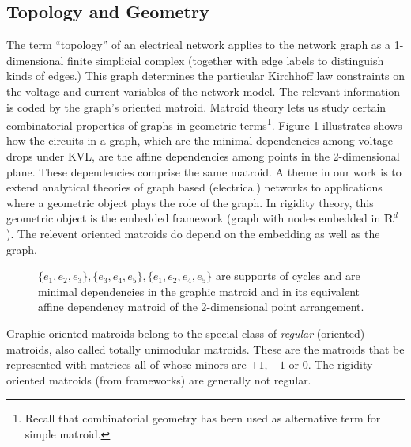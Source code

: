 \documentclass{amsproc-sunycstr}
\def\Reals{\ensuremath{\mathbf R}}
\theoremstyle{plain}
\theoremstyle{definition}
\theoremstyle{remark}
\begin{document}
\subsection{Topology and Geometry}
The term ``topology'' 
of an electrical network
applies to the network graph as a 
1-dimensional finite simplicial complex (together with edge labels to
distinguish kinds of edges.)  
This graph determines the particular Kirchhoff 
law constraints on the voltage and current variables
of the network model.
The relevant information is coded by the graph's
oriented matroid.
Matroid theory lets us study
certain combinatorial properties of graphs in geometric 
terms\footnote{Recall that combinatorial geometry has been
used as alternative term for simple matroid.}.  Figure \ref{graphgeo}
illustrates shows how the circuits in a graph,
which are the minimal dependencies among voltage drops under KVL,
are the affine dependencies among points in the 2-dimensional plane.
These dependencies comprise the same matroid.
A theme in our work
is to extend analytical theories of graph based (electrical)
networks to applications where a geometric object plays the role of 
the graph.  In rigidity theory, this geometric object is the embedded
framework (graph with nodes embedded in $\Reals^d$).  The relevent
oriented matroids do depend on the embedding as well as the graph.
\begin{figure}
\label{graphgeo}

\caption{$\{e_1,e_2,e_3\},\{e_3,e_4,e_5\},\{e_1,e_2,e_4,e_5\}$ are supports of
cycles and are minimal dependencies in the graphic matroid and in its
equivalent affine dependency matroid of the 2-dimensional 
point arrangement.}
\end{figure}

Graphic oriented matroids belong to the special class of \textit{regular}
(oriented) matroids, also called totally unimodular matroids.  
These are the matroids that
be represented with matrices all of whose minors are $+1$, $-1$ or 
$0$.   The rigidity oriented matroids (from frameworks) are generally
not regular.  
\end{document}

